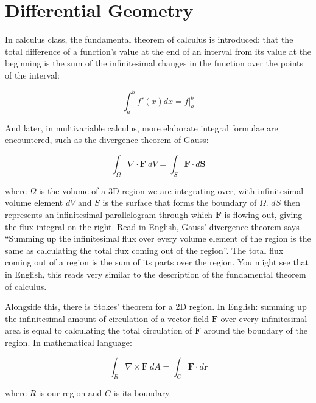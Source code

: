 
\chapter{Differential Geometry}\thispagestyle{empty}

In calculus class, the fundamental theorem of calculus is introduced: that the total difference of a function's value at the end of an interval from its value at the beginning is the sum of the infinitesimal changes in the function over the points of the interval:

	\begin{equation}\label{eq:FTOC}
		\int_a^b f'(x) dx = f\Big\rvert^b_a
	\end{equation}

And later, in multivariable calculus, more elaborate integral formulae are encountered, such as the divergence theorem of Gauss:

	\begin{equation}\label{eq:Divergence}
		\int_\Omega \nabla \cdot \mathbf{F} ~ dV = \int_S \mathbf{F} \cdot d\mathbf S
	\end{equation}

	where $\Omega$ is the volume of a 3D region we are integrating over, with infinitesimal volume element $dV$ and $S$ is the surface that forms the boundary of $\Omega$. $dS$ then represents an infinitesimal parallelogram through which $\mathbf{F}$ is flowing out, giving the flux integral on the right. Read in English, Gauss' divergence theorem says ``Summing up the infinitesimal flux over every volume element of the region is the same as calculating the total flux coming out of the region''. The total flux coming out of a region is the sum of its parts over the region. You might see that in English, this reads very similar to the description of the fundamental theorem of calculus.
	
	Alongside this, there is Stokes' theorem for a 2D region. In English: summing up the infinitesimal amount of circulation of a vector field $\mathbf F$ over every infinitesimal area is equal to calculating the total circulation of $\mathbf F$ around the boundary of the region. In mathematical language:
	
	\begin{equation}\label{eq:Stokes}
		\int_R \nabla \times \mathbf{F} ~ dA = \int_C \mathbf{F} \cdot d\mathbf r
	\end{equation}
	
	where $R$ is our region and $C$ is its boundary.
	

